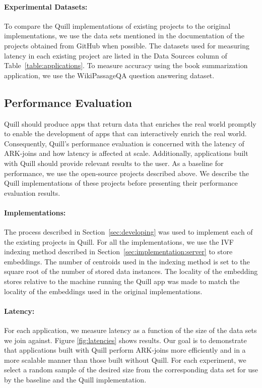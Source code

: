 \documentclass[11pt]{article}
\begin{document}
\paragraph{Experimental Datasets:}
\label{sec:evaluation:datasets}
To compare the Quill implementations of existing projects to the original implementations, we use the data sets mentioned in the documentation of the projects obtained from GitHub when possible.
The datasets used for measuring latency in each existing project are listed in the Data Sources column of Table~\ref{table:applications}.
To measure accuracy using the book summarization application, we use the WikiPassageQA \cite{cohen2018wikipassageqa} question answering dataset.

\subsection{Performance Evaluation}
\label{sec:evaluation:perf}
Quill should produce apps that return data that enriches the real world promptly to enable the development of apps that can interactively enrich the real world.
Consequently, Quill's performance evaluation is concerned with the latency of ARK-joins and how latency is affected at scale.
Additionally, applications built with Quill should provide relevant results to the user.
As a baseline for performance, we use the open-source projects described above.
We describe the Quill implementations of these projects before presenting their performance evaluation results.\vspace{0.1cm}

\paragraph{Implementations:}
\label{sec:evaluation:implementations}
The process described in Section~\ref{sec:developing} was used to implement each of the existing projects in Quill.
For all the implementations, we use the IVF indexing method described in Section~\ref{sec:implementation:server} to store embeddings.
The number of centroids used in the indexing method is set to the square root of the number of stored data instances.
The locality of the embedding stores relative to the machine running the Quill app was made to match the locality of the embeddings used in the original implementations.\vspace{0.1cm}

\paragraph{Latency:}
\label{sec:evaluation:latency}
For each application, we measure latency as a function of the size of the data sets we join against.
Figure \ref{fig:latencies} shows results.
Our goal is to demonstrate that applications built with Quill perform ARK-joins more efficiently and in a more scalable manner than those built without Quill.
For each experiment, we select a random sample of the desired size from the corresponding data set for use by the baseline and the Quill implementation.\vspace{0.1cm}
\end{document}

